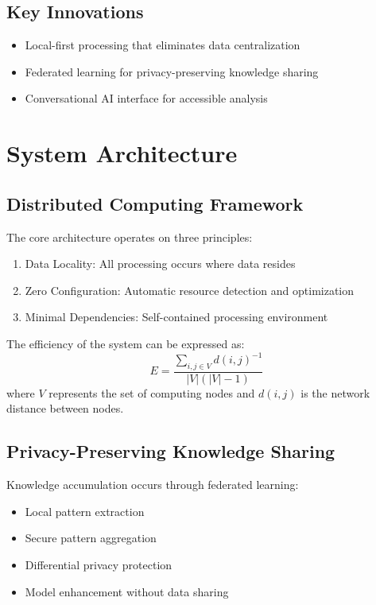 \documentclass[11pt,a4paper]{article}
\begin{document}
\subsection{Key Innovations}
\begin{itemize}
    \item Local-first processing that eliminates data centralization
    \item Federated learning for privacy-preserving knowledge sharing
    \item Conversational AI interface for accessible analysis
\end{itemize}

\section{System Architecture}

\subsection{Distributed Computing Framework}
The core architecture operates on three principles:
\begin{enumerate}
    \item Data Locality: All processing occurs where data resides
    \item Zero Configuration: Automatic resource detection and optimization
    \item Minimal Dependencies: Self-contained processing environment
\end{enumerate}

The efficiency of the system can be expressed as:
\begin{equation}
    E = \frac{\sum_{i,j \in V} d(i,j)^{-1}}{|V|(|V|-1)}
\end{equation}
where $V$ represents the set of computing nodes and $d(i,j)$ is the network distance between nodes.

\subsection{Privacy-Preserving Knowledge Sharing}
Knowledge accumulation occurs through federated learning:
\begin{itemize}
    \item Local pattern extraction
    \item Secure pattern aggregation
    \item Differential privacy protection
    \item Model enhancement without data sharing
\end{itemize}
\end{document}
